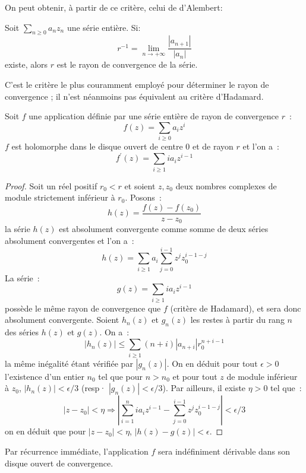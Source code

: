 On peut obtenir, à partir de ce critère, celui de d'Alembert:
\begin{fprop}
Soit $\sum_{n \geq 0}a_n z_n$ une série entière. Si:
\[
r^{-1} = \lim_{n \to +\infty}\frac{|a_{n+1}|}{|a_n|}
\]
existe, alors $r$ est le rayon de convergence de la série.
\end{fprop} 

C'est le critère le plus couramment employé pour déterminer le rayon de
convergence ; il n'est néanmoins pas équivalent au critère d'Hadamard.
\begin{fthm}
Soit $f$ une application définie par une série entière de rayon de
convergence $r$~:
\[
f(z) = \sum_{i \geq 0} a_i z^i
\]
$f$ est holomorphe dans le disque ouvert de centre 0 et de rayon $r$
et l'on a~:
\[
f^\prime(z) = \sum_{i \geq 1} i a_{i} z^{i-1}
\]
\end{fthm}
\begin{proof}
Soit un réel positif $r_0 < r$ et soient $z,z_0$ deux nombres complexes
de module strictement inférieur à $r_0$. Posons~:
\[
h(z) = \frac{f(z) - f(z_0)}{z-z_0}
\]
la série $h(z)$ est absolument convergente comme somme de deux séries
absolument convergentes et l'on a~:
\[
h(z) = \sum_{i \geq 1} a_i \sum_{j = 0}^{i-1} z^j z_0^{i-1-j}
\]
La série~:
\[
g(z) = \sum_{i \geq 1} i a_{i} z^{i-1}
\]
possède le même rayon de convergence que $f$ (critère de Hadamard), et sera donc
absolument convergente. 
Soient $h_n(z)$ et $g_n(z)$ les restes à partir du rang $n$ des séries
$h(z)$ et $g(z)$. On a~:
\[
|h_n(z)| \leq \sum_{i \geq 1} (n+i) |a_{n+i}| r_0^{n+i-1}
\]
la même inégalité étant vérifiée par $|g_n(z)|$. On en déduit
pour tout $\epsilon > 0$ l'existence d'un entier $n_0$ tel que pour $n
> n_0$ et pour tout $z$ de module inférieur à $z_0$, $|h_n(z)| <
\epsilon / 3$ (resp·  $|g_n(z)| < \epsilon / 3$). Par ailleurs, il
existe $\eta > 0$ tel que~:
\[
|z-z_0| < \eta \Rightarrow 
 | \sum_{i = 1}^n  i a_{i} z^{i-1} - \sum_{j = 0}^{i-1} z^j
 z_0^{i-1-j} | < \epsilon / 3 
\]
on en déduit que pour $|z-z_0| < \eta$, $|h(z) - g(z)| < \epsilon$.
\end{proof}
\begin{rem}
Par récurrence immédiate, l'application $f$ sera indéfiniment
dérivable dans son disque ouvert de convergence.
\end{rem}


